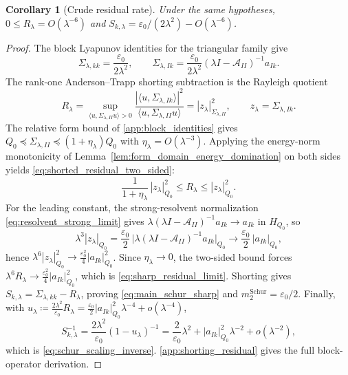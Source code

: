 \documentclass[preprint,12pt]{elsarticle}
\theoremstyle{plain}
\newtheorem{corollary}[theorem]{Corollary}
\theoremstyle{definition}
\theoremstyle{remark}
\begin{document}
    \begin{corollary}[Crude residual rate]
        \label{cor:crude_residual_rate}
        Under the same hypotheses, $0\le R_\lambda=O(\lambda^{-6})$ and
        $S_{k,\lambda}=\varepsilon_0/(2\lambda^2)-O(\lambda^{-6})$.
    \end{corollary}
    \begin{proof}
        The block Lyapunov identities for the triangular family give
        \[
            \Sigma_{\lambda,kk}=\frac{\varepsilon_0}{2\lambda^2},
            \qquad
            \Sigma_{\lambda,Ik}
            =
            \frac{\varepsilon_0}{2\lambda^2}
            (\lambda I-\mathcal{A}_{II})^{-1}a_{Ik}.
        \]
        The rank-one An\-der\-son--Trapp shorting subtraction is the
        Rayleigh quotient
        \[
            R_\lambda
            =
            \sup_{\langle u,\Sigma_{\lambda,II}u\rangle>0}
            \frac{|\langle u,\Sigma_{\lambda,Ik}\rangle|^2}
                 {\langle u,\Sigma_{\lambda,II}u\rangle}
            =
            |z_\lambda|_{\Sigma_{\lambda,II}}^2,
            \qquad z_\lambda=\Sigma_{\lambda,Ik}.
        \]
        The relative form bound of \ref{app:block_identities} gives
        $Q_0\preceq\Sigma_{\lambda,II}\preceq(1+\eta_\lambda)Q_0$ with
        $\eta_\lambda=O(\lambda^{-3})$.  Applying the energy-norm monotonicity of
        Lemma~\ref{lem:form_domain_energy_domination} on both sides yields
        \eqref{eq:shorted_residual_two_sided}:
        \[
            \frac{1}{1+\eta_\lambda}\,|z_\lambda|_{Q_0}^2
            \le R_\lambda \le |z_\lambda|_{Q_0}^2 .
        \]
        For the leading constant, the strong-resolvent normalization
        \eqref{eq:resolvent_strong_limit} gives
        $\lambda(\lambda I-\mathcal{A}_{II})^{-1}a_{Ik}\to a_{Ik}$ in $H_{Q_0}$,
        so
        \[
            \lambda^3|z_\lambda|_{Q_0}
            =\frac{\varepsilon_0}{2}\,
             \bigl|\lambda(\lambda I-\mathcal{A}_{II})^{-1}a_{Ik}\bigr|_{Q_0}
            \longrightarrow \frac{\varepsilon_0}{2}\,|a_{Ik}|_{Q_0},
        \]
        hence $\lambda^6|z_\lambda|_{Q_0}^2\to\tfrac{\varepsilon_0^2}{4}|a_{Ik}|_{Q_0}^2$.
        Since $\eta_\lambda\to0$, the two-sided bound forces
        $\lambda^6R_\lambda\to\tfrac{\varepsilon_0^2}{4}|a_{Ik}|_{Q_0}^2$, which is
        \eqref{eq:sharp_residual_limit}.  Shorting gives
        $S_{k,\lambda}=\Sigma_{\lambda,kk}-R_\lambda$, proving
        \eqref{eq:main_schur_sharp} and $m_2^{\mathrm{Schur}}=\varepsilon_0/2$.
        Finally, with $u_\lambda\coloneqq\tfrac{2\lambda^2}{\varepsilon_0}R_\lambda
        =\tfrac{\varepsilon_0}{2}|a_{Ik}|_{Q_0}^2\lambda^{-4}+o(\lambda^{-4})$,
        \[
            S_{k,\lambda}^{-1}
            =\frac{2\lambda^2}{\varepsilon_0}(1-u_\lambda)^{-1}
            =\frac{2}{\varepsilon_0}\lambda^2
             +|a_{Ik}|_{Q_0}^2\lambda^{-2}+o(\lambda^{-2}),
        \]
        which is \eqref{eq:schur_scaling_inverse}.  \ref{app:shorting_residual}
        gives the full block-operator derivation.
    \end{proof}
\end{document}
